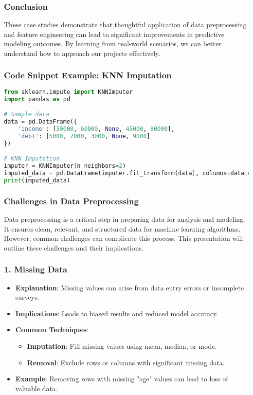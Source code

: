 \documentclass[aspectratio=169]{beamer}
\begin{document}
\begin{frame}
    \frametitle{Conclusion}
    These case studies demonstrate that thoughtful application of data preprocessing and feature engineering can lead to significant improvements in predictive modeling outcomes. By learning from real-world scenarios, we can better understand how to approach our projects effectively.
\end{frame}

\begin{frame}[fragile]
    \frametitle{Code Snippet Example: KNN Imputation}
    \begin{lstlisting}[language=Python]
from sklearn.impute import KNNImputer
import pandas as pd

# Sample data
data = pd.DataFrame({
    'income': [50000, 60000, None, 45000, 80000],
    'debt': [5000, 7000, 3000, None, 9000]
})

# KNN Imputation
imputer = KNNImputer(n_neighbors=2)
imputed_data = pd.DataFrame(imputer.fit_transform(data), columns=data.columns)
print(imputed_data)
    \end{lstlisting}
\end{frame}

\begin{frame}
  \frametitle{Challenges in Data Preprocessing}
  Data preprocessing is a critical step in preparing data for analysis and modeling. 
  It ensures clean, relevant, and structured data for machine learning algorithms. 
  However, common challenges can complicate this process. 
  This presentation will outline these challenges and their implications.
\end{frame}

\begin{frame}
  \frametitle{1. Missing Data}
  \begin{itemize}
    \item \textbf{Explanation}: Missing values can arise from data entry errors or incomplete surveys.
    \item \textbf{Implications}: Leads to biased results and reduced model accuracy.
    \item \textbf{Common Techniques}:
      \begin{itemize}
        \item \textbf{Imputation}: Fill missing values using mean, median, or mode.
        \item \textbf{Removal}: Exclude rows or columns with significant missing data.
      \end{itemize}
    \item \textbf{Example}: Removing rows with missing "age" values can lead to loss of valuable data.
  \end{itemize}
\end{frame}
\end{document}
